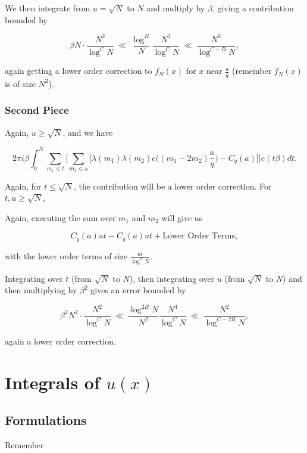 \documentclass[12pt,letterpaper]{report}
\newcommand\be{\begin{equation}}
\newcommand\ee{\end{equation}}
\newcommand{\gl}{\lambda}
\begin{document}
We then integrate from $u = \sqrt{N}$ to $N$ and multiply by
$\beta$, giving a contribution bounded by

\be \beta N \cdot \frac{N^2}{\log^C N} \ \ll \ \frac{\log^B}{N}
\frac{N^3}{\log^C N} \ \ll \ \frac{N^2}{\log^{C-B} N}, \ee

again getting a lower order correction to $f_N(x)$ for $x$ near
$\frac{a}{q}$ (remember $f_N(x)$ is of size $N^2$).


\subsubsection{Second Piece}

Again, $u \ge \sqrt{N}$, and we have

\be 2\pi i \beta \int_0^N \sum_{m_1 \le t} \Bigg[ \sum_{m_2 \le u}
\Big[ \gl(m_1)\gl(m_2)e\Big( (m_1 - 2m_2)\frac{a}{q}\Big)  -
C_q(a) \Big]  \Bigg]e(t\beta)dt.  \ee

Again, for $t \le \sqrt{N}$, the contribution will be a lower
order correction. For $t, u \ge \sqrt{N}$,

Again, executing the sum over $m_1$ and $m_2$ will give us

\be C_q(a) ut - C_q(a)ut + \text{Lower Order Terms}, \ee

with the lower order terms of size $\frac{ut}{\log^C N}$.

Integrating over $t$ (from $\sqrt{N}$ to $N$), then integrating
over $u$ (from $\sqrt{N}$ to $N$) and then multiplying by
$\beta^2$ gives an error bounded by

\be \beta^2 N^2 \cdot \frac{N^2}{\log^C N} \ \ll \ \frac{\log^{2B}
N}{N^2} \frac{N^4}{\log^C N} \ \ll \ \frac{N^2}{\log^{C - 2B} N},
\ee

again a lower order correction.




\section{Integrals of $u(x)$}

\subsection{Formulations}

Remember
\end{document}
